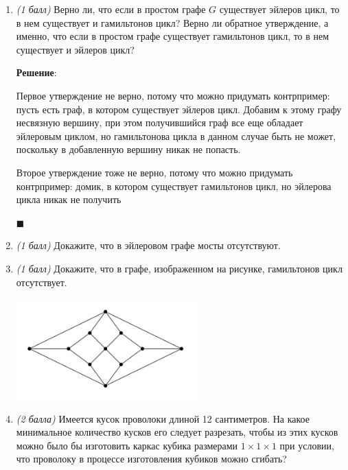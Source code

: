 \documentclass{article}
\begin{document}
\begin{enumerate}

    \item \textit{(1 балл)} Верно ли, что если в простом графе $G$ существует эйлеров цикл, то в нем существует и гамильтонов цикл? Верно ли обратное утверждение, а именно, что если в простом графе существует гамильтонов цикл, то в нем существует и эйлеров цикл?
    
    \textbf{Решение}:

    Первое утверждение не верно, потому что можно придумать контрпример: пусть есть граф, в котором существует эйлеров цикл. Добавим к этому графу несвязную вершину, при этом получившийся граф все еще обладает эйлеровым циклом, но гамильтонова цикла в данном случае быть не может, поскольку в добавленную вершину никак не попасть.

    Второе утверждение тоже не верно, потому что можно придумать контрпример: домик, в котором существует гамильтонов цикл, но эйлерова цикла никак не получить
    \begin{figure}[h!]
        \centering
    \end{figure}
    \begin{flushright}
        $\blacksquare$
    \end{flushright}
    
    \item \textit{(1 балл)} Докажите, что в эйлеровом графе мосты отсутствуют.
    
    \item \textit{(1 балл)} Докажите, что в графе, изображенном на рисунке, гамильтонов цикл отсутствует.
    \begin{center}
        \includegraphics[width=7cm]{images/2.3.png}
    \end{center}
    
    \item \textit{(2 балла)} Имеется кусок проволоки длиной 12 сантиметров. На какое минимальное количество кусков его следует
    разрезать, чтобы из этих кусков можно было бы изготовить каркас кубика размерами $1\times1\times1$ при условии, что проволоку в процессе изготовления кубиков можно сгибать?
    

\end{enumerate}
\end{document}
